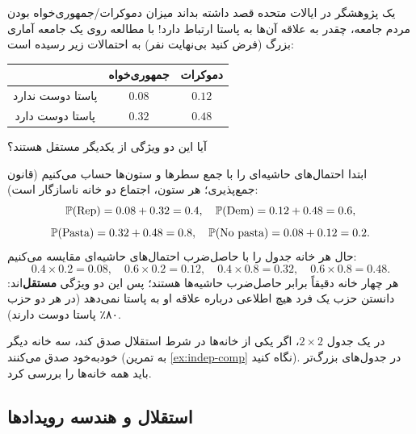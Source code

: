 \begin{example}
یک پژوهشگر در ایالات متحده قصد داشته بداند میزان دموکرات/جمهوری‌خواه بودن مردم جامعه، چقدر به علاقه آن‌ها به پاستا ارتباط دارد! با مطالعه روی یک جامعه آماری بزرگ (فرض کنید بی‌نهایت نفر) به احتمالات زیر رسیده است:
\begin{center}
\renewcommand{\arraystretch}{1.4}
\begin{tabular}{c|c|c}
 & جمهوری‌خواه & دموکرات \\ \hline
پاستا دوست ندارد & $0.08$ & $0.12$\\ \hline
پاستا دوست دارد & $0.32$ & $0.48$
\end{tabular}
\end{center}
آیا این دو ویژگی از یکدیگر مستقل هستند؟
\begin{solution}
ابتدا احتمال‌های حاشیه‌ای را با جمع سطرها و ستون‌ها حساب می‌کنیم (قانون جمع‌پذیری؛ هر ستون، اجتماع دو خانه ناسازگار است):
\[
\mathbb{P}(\text{Rep})=0.08+0.32=0.4,\quad \mathbb{P}(\text{Dem})=0.12+0.48=0.6,
\]
\[
\mathbb{P}(\text{Pasta})=0.32+0.48=0.8,\quad \mathbb{P}(\text{No pasta})=0.08+0.12=0.2.
\]
حال هر خانه جدول را با حاصل‌ضرب احتمال‌های حاشیه‌ای مقایسه می‌کنیم:
\[
0.4\times0.2=0.08,\quad 0.6\times0.2=0.12,\quad 0.4\times0.8=0.32,\quad 0.6\times0.8=0.48 .
\]
هر چهار خانه دقیقاً برابر حاصل‌ضرب حاشیه‌ها هستند؛ پس این دو ویژگی \textbf{مستقل}‌اند: دانستن حزب یک فرد هیچ اطلاعی درباره علاقه او به پاستا نمی‌دهد (در هر دو حزب ۸۰٪ پاستا دوست دارند).
\end{solution}
\end{example}

\begin{note}
\notetitle در یک جدول $2\times2$، اگر یکی از خانه‌ها در شرط استقلال صدق کند، سه خانه دیگر خودبه‌خود صدق می‌کنند (به تمرین \ref{ex:indep-comp} نگاه کنید). در جدول‌های بزرگ‌تر باید همه خانه‌ها را بررسی کرد.
\end{note}

\subsection{استقلال و هندسه رویدادها}

